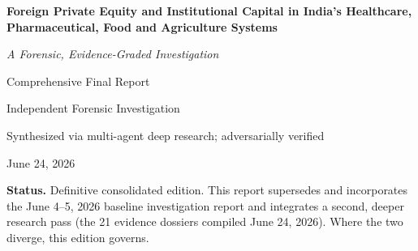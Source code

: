 \documentclass[11pt,a4paper]{article}
\begin{document}
\begin{titlepage}
\begin{center}
\vspace*{1.5cm}
{\LARGE\bfseries Foreign Private Equity and Institutional Capital in India's Healthcare, Pharmaceutical, Food and Agriculture Systems\par}
\vspace{0.8cm}
{\large\itshape A Forensic, Evidence-Graded Investigation\par}
\vspace{0.3cm}
{\large Comprehensive Final Report\par}
\vspace{1.5cm}
{\large Independent Forensic Investigation\par}
\vspace{0.3cm}
{\normalsize Synthesized via multi-agent deep research; adversarially verified\par}
\vspace{2.0cm}
{\large June 24, 2026\par}
\vfill
\begin{minipage}{0.86\textwidth}
\small
\textbf{Status.} Definitive consolidated edition. This report supersedes and incorporates the June 4--5, 2026 baseline investigation report and integrates a second, deeper research pass (the 21 evidence dossiers compiled June 24, 2026). Where the two diverge, this edition governs.
\end{minipage}
\end{center}
\end{titlepage}

\end{document}
